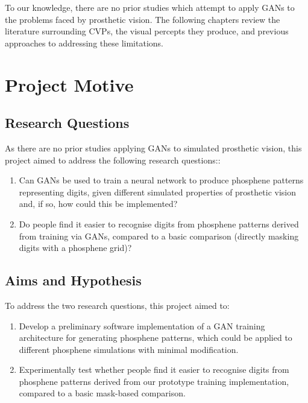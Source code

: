 \documentclass[11pt]{book}
\begin{document}
To our knowledge, there are no prior studies which attempt to apply GANs to the problems faced by prosthetic vision.
The following chapters review the literature surrounding CVPs, the visual percepts they produce, and previous approaches to addressing these limitations.

\chapter{Project Motive}
\label{sec:orgca01afd}

\section*{Research Questions}
\label{sec:org4568c3f}

As there are no prior studies applying GANs to simulated prosthetic vision, this project aimed to address the following research questions::

\begin{enumerate}
\item Can GANs be used to train a neural network to produce phosphene patterns representing digits, given different simulated properties of prosthetic vision and, if so, how could this be implemented?
\item Do people find it easier to recognise digits from phosphene patterns derived from training via GANs, compared to a basic comparison (directly masking digits with a phosphene grid)?
\end{enumerate}

\section*{Aims and Hypothesis}
\label{sec:orgde30108}

To address the two research questions, this project aimed to:

\begin{enumerate}
\item Develop a preliminary software implementation of a GAN training architecture for generating phosphene patterns, which could be applied to different phosphene simulations with minimal modification.
\item Experimentally test whether people find it easier to recognise digits from phosphene patterns derived from our prototype training implementation, compared to a basic mask-based comparison.
\end{enumerate}
\end{document}

